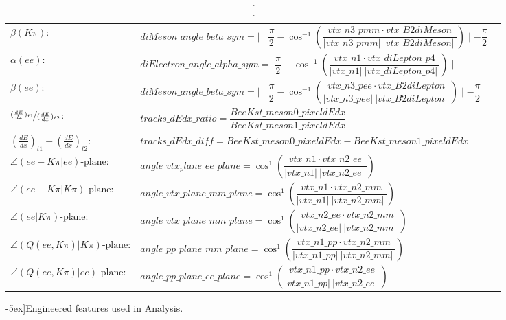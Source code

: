 \begin{table}
\begin{center}
\begin{tabular}{lm{11.9cm}}
$\beta(K\pi)$:& $diMeson\_angle\_beta\_sym = \mid  \mid \dfrac{\pi}{2} -   \cos^{-1}\left(\dfrac{vtx\_n3\_pmm\cdot vtx\_B2diMeson }{\lvert vtx\_n3\_pmm \rvert\ \lvert vtx\_B2diMeson \rvert\ }\right)  \mid  - \dfrac{\pi}{2}  \mid   $\\


$\alpha(ee)$:& $diElectron\_angle\_alpha\_sym = \mid \dfrac{\pi}{2} - \cos^{-1}\left(\dfrac{vtx\_n1\cdot vtx\_diLepton\_p4 }{\lvert vtx\_n1 \rvert\ \lvert vtx\_diLepton\_p4 \rvert\ }\right) \mid$\\

$\beta(ee)$:& $diMeson\_angle\_beta\_sym = \mid  \mid \dfrac{\pi}{2} -   \cos^{-1}\left(\dfrac{vtx\_n3\_pee\cdot vtx\_B2diLepton }{\lvert vtx\_n3\_pee \rvert\ \lvert vtx\_B2diLepton \rvert\ }\right)  \mid  - \dfrac{\pi}{2}  \mid   $\\

$\nicefrac{(\frac{dE}{dx})_{t1}}{(\frac{dE}{dx})_{t2}}$: & $tracks\_dEdx\_ratio = \dfrac{BeeKst\_meson0\_pixeldEdx}{BeeKst\_meson1\_pixeldEdx}$\\

$(\frac{dE}{dx})_{t1}-(\frac{dE}{dx})_{t2}$: & $tracks\_dEdx\_diff = BeeKst\_meson0\_pixeldEdx -BeeKst\_meson1\_pixeldEdx$\\

$\angle(ee-K\pi|ee)\text{-plane}$: & $angle\_vtx_plane\_ee\_plane =  \cos^1\left(\dfrac{vtx\_n1\cdot vtx\_n2\_ee }{\lvert vtx\_n1 \rvert\ \lvert vtx\_n2\_ee \rvert\ }\right) $\\

$\angle(ee-K\pi|K\pi)\text{-plane}$: & $angle\_vtx\_plane\_mm\_plane =  \cos^1\left(\dfrac{vtx\_n1\cdot vtx\_n2\_mm }{\lvert vtx\_n1 \rvert\ \lvert vtx\_n2\_mm \rvert\ }\right) $\\

$\angle(ee|K\pi)\text{-plane}$: & $angle\_vtx\_plane\_mm\_plane =  \cos^1\left(\dfrac{vtx\_n2\_ee\cdot vtx\_n2\_mm }{\lvert vtx\_n2\_ee \rvert\ \lvert vtx\_n2\_mm \rvert\ }\right) $\\

$\angle(Q(ee,K\pi)|K\pi)\text{-plane}$: & $angle\_pp\_plane\_mm\_plane =  \cos^1\left(\dfrac{vtx\_n1\_pp\cdot vtx\_n2\_mm }{\lvert vtx\_n1\_pp \rvert\ \lvert vtx\_n2\_mm \rvert\ }\right) $\\

$\angle(Q(ee,K\pi)|ee)\text{-plane}$: & $angle\_pp\_plane\_ee\_plane =  \cos^1\left(\dfrac{vtx\_n1\_pp\cdot vtx\_n2\_ee }{\lvert vtx\_n1\_pp \rvert\ \lvert vtx\_n2\_ee \rvert\ }\right) $\\

      \bottomrule
    \end{tabular}
  \end{center}
  \caption[Engineered features used in Analysis][-5ex]{\footnotesize Engineered features used in Analysis.}
  \label{tab:FeatureEngennering}
\end{table}
